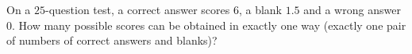 On a $25$-question test, a correct answer scores $6$, a blank $1.5$ and a wrong answer $0$. How many possible scores can be obtained in exactly one way (exactly one pair of numbers of correct answers and blanks)?
